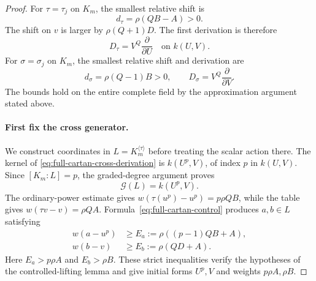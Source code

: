 \begin{proof}
For $\tau=\tau_j$ on $K_m$, the smallest relative shift is
\[
 d_\tau=\rho(QB-A)>0.
\]
The shift on $v$ is larger by $\rho(Q+1)D$. The first derivation is therefore
\begin{equation}\label{eq:full-cartan-cross-derivation}
 D_\tau=V^Q\frac{\partial}{\partial U}
       \quad\text{on }k(U,V).
\end{equation}
For $\sigma=\sigma_j$ on $K_m$, the smallest relative shift and derivation are
\begin{equation}\label{eq:full-cartan-scalar-shift}
 d_\sigma=\rho(Q-1)B>0,\qquad
 D_\sigma=V^Q\frac{\partial}{\partial V}.
\end{equation}
The bounds hold on the entire complete field by the approximation argument stated above.

\paragraph{First fix the cross generator.}
We construct coordinates in $L=K_m^{\langle\tau\rangle}$ before treating the scalar action there. The kernel of \eqref{eq:full-cartan-cross-derivation} is $k(U^p,V)$, of index $p$ in $k(U,V)$. Since $[K_m:L]=p$, the graded-degree argument proves
\begin{equation}\label{eq:full-cartan-cross-field}
 \mathcal G(L)=k(U^p,V).
\end{equation}
The ordinary-power estimate gives $w(\tau(u^p)-u^p)=p\rho QB$, while the table gives $w(\tau v-v)=\rho QA$. Formula~\eqref{eq:full-cartan-control} produces $a,b\in L$ satisfying
\begin{equation}\label{eq:full-cartan-first-errors}
 \begin{split}
 w(a-u^p)&\ge E_a:=\rho((p-1)QB+A),\\
 w(b-v)&\ge E_b:=\rho(QD+A).
 \end{split}
\end{equation}
Here $E_a>p\rho A$ and $E_b>\rho B$. These strict inequalities verify the hypotheses of the controlled-lifting lemma and give initial forms $U^p,V$ and weights $p\rho A,\rho B$.


\end{proof}
